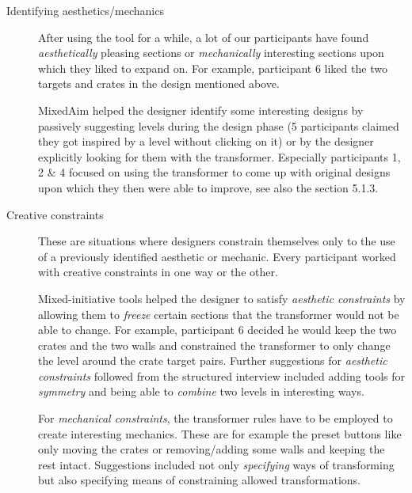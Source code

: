 \begin{description}
\item[Identifying aesthetics/mechanics] After using the tool for a while, a lot of our participants have found \textit{aesthetically} pleasing sections or \textit{mechanically} interesting sections upon which they liked to expand on. For example, participant 6 liked the two targets and crates in the design mentioned above.



MixedAim helped the designer identify some interesting designs by passively suggesting levels during the design phase (5 participants claimed they got inspired by a level without clicking on it) or by the designer explicitly looking for them with the transformer. Especially participants 1, 2 \& 4 focused on using the transformer to come up with original designs upon which they then were able to improve, see also the section 5.1.3. 

\item[Creative constraints] These are situations where designers constrain themselves only to the use of a previously identified aesthetic or mechanic. Every participant worked with creative constraints in one way or the other.

Mixed-initiative tools helped the designer to satisfy \textit{aesthetic constraints} by allowing them to \textit{freeze} certain sections that the transformer would not be able to change. For example, participant 6 decided he would keep the two crates and the two walls and constrained the transformer to only change the level around the crate target pairs. Further suggestions for \textit{aesthetic constraints} followed from the structured interview included adding tools for \textit{symmetry} and being able to \textit{combine} two levels in interesting ways.

For \textit{mechanical constraints}, the transformer rules have to be employed to create interesting mechanics. These are for example the preset buttons like only moving the crates or removing/adding some walls and keeping the rest intact. Suggestions included not only \textit{specifying} ways of transforming but also specifying means of constraining allowed transformations. 


\end{description}
